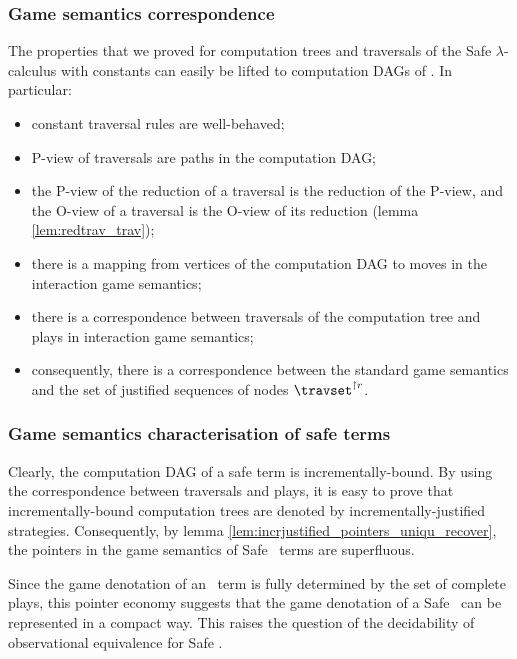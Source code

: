 \subsubsection{Game semantics correspondence}
The properties that we proved for computation trees and traversals of the Safe $\lambda$-calculus with constants
can easily be lifted to computation DAGs of \ialgol.
In particular:
\begin{itemize}
\item constant traversal rules are well-behaved;
\item P-view of traversals are paths in the computation DAG;
\item the P-view of the reduction of a traversal is the reduction of the P-view,
and the O-view of a traversal is the O-view of its reduction (lemma \ref{lem:redtrav_trav});
\item there is a mapping from vertices of the computation DAG to moves in the interaction game semantics;
\item there is a correspondence between traversals of the computation tree and plays in interaction game semantics;
\item consequently, there is a correspondence between the standard game semantics and
the set of justified sequences of nodes $\travset^{\upharpoonright r}$.
\end{itemize}

\subsubsection{Game semantics characterisation of safe terms}
Clearly, the computation DAG of a safe term is incrementally-bound.
By using the correspondence between traversals and plays, it is easy to prove that
incrementally-bound computation trees are denoted by incrementally-justified strategies.
Consequently, by lemma \ref{lem:incrjustified_pointers_uniqu_recover}, the pointers in the game semantics
of Safe \ialgol\ terms are superfluous.

Since the game denotation of an \ialgol\ term is fully determined by the set of complete plays,
this pointer economy suggests that the game denotation of a Safe \ialgol\ can be represented in a compact way.
This raises the question of the decidability of observational equivalence for Safe \ialgol.
